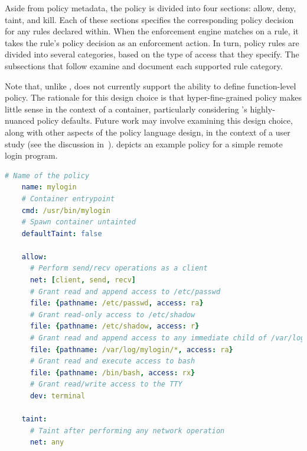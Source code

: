 Aside from policy metadata, the policy is divided into four sections: allow, deny, taint,
and kill. Each of these sections specifies the corresponding policy decision for any rules
declared within. When the \bpfcontain{} enforcement engine matches on a rule, it takes the
rule's policy decision as an enforcement action. In turn, policy rules are divided into
several categories, based on the type of access that they specify. The subsections that
follow examine and document each supported rule category.

Note that, unlike \bpfbox{}, \bpfcontain{} does not currently support the ability to
define function-level policy. The rationale for this design choice is that
hyper-fine-grained policy makes little sense in the context of a container, particularly
considering \bpfcontain{}'s highly-nuanced policy defaults. Future work may involve
examining this design choice, along with other aspects of the \bpfcontain{} policy
language design, in the context of a user study (see the discussion
in~).  depicts an example
\bpfcontain{} policy for a simple remote login program.

\begin{lstlisting}[language=yaml, gobble=4,
  caption={[An example \bpfcontain{} policy  written in YAML]
    An example \bpfcontain{} policy for a simple remote login program, written in YAML.
    This example offers a fairly complete idea of the \bpfcontain{} policy language's
    various features. Note that, in the context of a Docker container, all of the
    \enquote{file rules} under this policy would be unnecessary; they would be implicitly
    covered by the container's namespace membership. The reader is encouraged to compare
    this policy with the policy depicted in \Cref{lst:bpfbox-policy-example} on page
    \pageref{lst:bpfbox-policy-example}.
  },
  label={lst:bpfcontain-policy-example}, float]
    # Name of the policy
    name: mylogin
    # Container entrypoint
    cmd: /usr/bin/mylogin
    # Spawn container untainted
    defaultTaint: false

    allow:
      # Perform send/recv operations as a client
      net: [client, send, recv]
      # Grant read and append access to /etc/passwd
      file: {pathname: /etc/passwd, access: ra}
      # Grant read-only access to /etc/shadow
      file: {pathname: /etc/shadow, access: r}
      # Grant read and append access to any immediate child of /var/log/mylogin
      file: {pathname: /var/log/mylogin/*, access: ra}
      # Grant read and execute access to bash
      file: {pathname: /bin/bash, access: rx}
      # Grant read/write access to the TTY
      dev: terminal

    taint:
      # Taint after performing any network operation
      net: any
\end{lstlisting}

